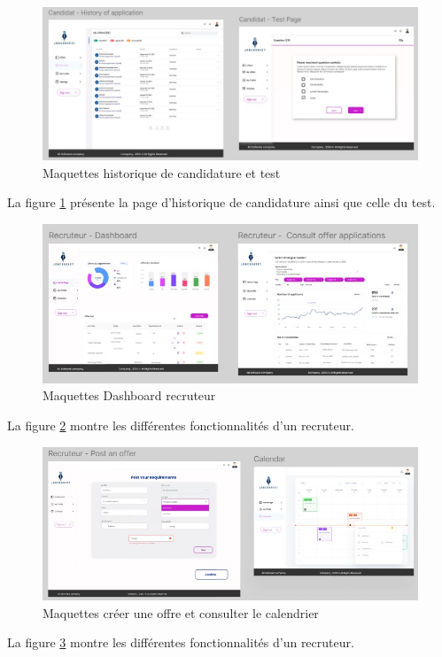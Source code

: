 \begin{figure}[htbp]
   \centering
   \includegraphics[scale=0.9]{Images/3.jpg} 
   \caption{Maquettes historique de candidature et test}
   \label{fig:maquette3}
\end{figure}
La figure \ref{fig:maquette3} présente la page d'historique de candidature ainsi que celle du test.
\vspace{2cm}
\begin{figure}[H]
   \centering
   \includegraphics[scale=1.2]{Images/4.jpg} 
   \caption{Maquettes Dashboard recruteur}
   \label{fig:maquette4}
\end{figure}


La figure \ref{fig:maquette4} montre les différentes fonctionnalités d'un recruteur.


\begin{figure}[htbp]
   \centering
   \includegraphics[scale=1.1]{Images/5.jpg} 
   \caption{Maquettes créer une offre et consulter le calendrier}
   \label{fig:maquette5}
\end{figure}
La figure \ref{fig:maquette5} montre les différentes fonctionnalités d'un recruteur.


